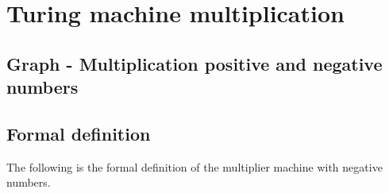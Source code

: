 \documentclass[11pt]{article}
\begin{document}
\date{}
\maketitle

\tableofcontents
\pagebreak

\section{Turing machine multiplication}
\subsection{Graph - Multiplication positive and negative numbers}

\begin{center}
\end{center}

\clearpage

\subsection{Formal definition}
The following is the formal definition of the multiplier machine with negative numbers.
\end{document}
